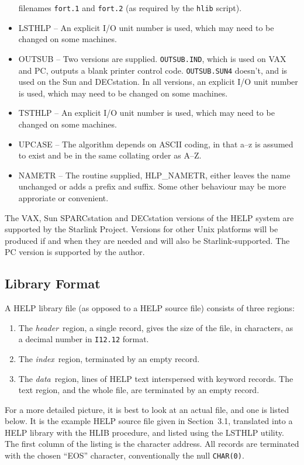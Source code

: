\begin{itemize}
filenames \verb|fort.1| and \verb|fort.2| (as required by the \verb|hlib|
script).
\item LSTHLP -- An explicit I/O unit number is used, which may need to
be changed on some machines.
\item OUTSUB -- Two versions are supplied.
\verb|OUTSUB.IND|, which is used on VAX and PC, outputs
a blank printer control code. \verb|OUTSUB.SUN4| doesn't, and is
used on the Sun and DECstation.
In all versions, an explicit I/O unit number is used,
which may need to be changed on some machines.
\item TSTHLP -- An explicit I/O unit number is used, which may need to
be changed on some machines.
\item UPCASE -- The algorithm depends on ASCII coding, in that
a--z is assumed to exist and be in the same collating order as A--Z.
\item NAMETR -- The routine supplied, HLP\_NAMETR, either leaves
the name unchanged or adds a prefix and suffix.  Some
other behaviour may be more approriate or convenient.
\end{itemize}

The VAX, Sun SPARCstation and DECstation versions of the HELP system
are supported by the Starlink Project.  Versions for other Unix
platforms will be produced if and when they are needed and will
also be Starlink-supported.  The PC version is supported by the author.

\subsection{Library Format}
A HELP library file (as opposed to a HELP source file)
consists of three regions:
\begin{enumerate}
\item The {\it header}\, region, a single record, gives the size of the
file, in characters, as a decimal number in \verb|I12.12| format.
\item The {\it index}\, region, terminated by an empty record.
\item The {\it data}\, region, lines of HELP
text interspersed with keyword records.  The text region, and
the whole file, are terminated by an empty record.
\end{enumerate}

For a more detailed picture, it is best to look at an
actual file, and one is listed below.  It is the
example HELP source file given in Section~3.1, translated
into a HELP library with the HLIB procedure, and listed using the
LSTHLP utility.
The first column of the listing is the character address.  All
records are terminated with the chosen ``EOS'' character,
conventionally the null \verb|CHAR(0)|.

